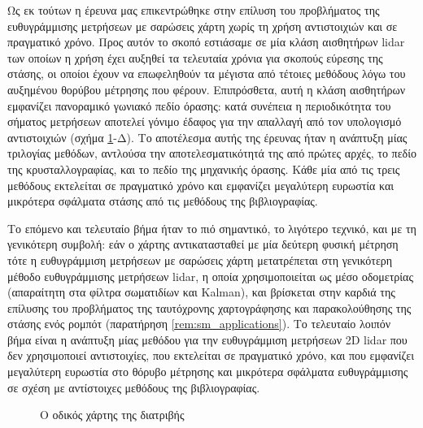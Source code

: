 Ως εκ τούτων η έρευνα μας επικεντρώθηκε στην επίλυση του προβλήματος της
ευθυγράμμισης μετρήσεων με σαρώσεις χάρτη χωρίς τη χρήση αντιστοιχιών και σε
πραγματικό χρόνο. Προς αυτόν το σκοπό εστιάσαμε σε μία κλάση αισθητήρων lidar
των οποίων η χρήση έχει αυξηθεί τα τελευταία χρόνια για σκοπούς εύρεσης της
στάσης, οι οποίοι έχουν να επωφεληθούν τα μέγιστα από τέτοιες μεθόδους λόγω
του αυξημένου θορύβου μέτρησης που φέρουν. Επιπρόσθετα, αυτή η κλάση αισθητήρων
εμφανίζει πανοραμικό γωνιακό πεδίο όρασης: κατά συνέπεια η περιοδικότητα του
σήματος μετρήσεων αποτελεί γόνιμο έδαφος για την απαλλαγή από τον υπολογισμό
αντιστοιχιών (σχήμα \ref{fig:roadmap}-Δ). Το αποτέλεσμα αυτής της έρευνας ήταν
η ανάπτυξη μίας τριλογίας μεθόδων, αντλούσα την αποτελεσματικότητά της από
πρώτες αρχές, το πεδίο της κρυσταλλογραφίας, και το πεδίο της μηχανικής όρασης.
Κάθε μία από τις τρεις μεθόδους εκτελείται σε πραγματικό χρόνο και εμφανίζει
μεγαλύτερη ευρωστία και μικρότερα σφάλματα στάσης από τις μεθόδους της
βιβλιογραφίας.

Το επόμενο και τελευταίο βήμα ήταν το πιό σημαντικό, το λιγότερο τεχνικό, και
με τη γενικότερη συμβολή: εάν ο χάρτης αντικατασταθεί με μία δεύτερη φυσική
μέτρηση τότε η ευθυγράμμιση μετρήσεων με σαρώσεις χάρτη μετατρέπεται στη
γενικότερη μέθοδο ευθυγράμμισης μετρήσεων lidar, η οποία χρησιμοποιείται
ως μέσο οδομετρίας (απαραίτητη στα φίλτρα σωματιδίων και Kalman), και βρίσκεται
στην καρδιά της επίλυσης του προβλήματος της ταυτόχρονης χαρτογράφησης και
παρακολούθησης της στάσης ενός ρομπότ (παρατήρηση \ref{rem:sm_applications}).
Το τελευταίο λοιπόν βήμα είναι η ανάπτυξη μίας μεθόδου για την ευθυγράμμιση
μετρήσεων 2D lidar που δεν χρησιμοποιεί αντιστοιχίες, που εκτελείται σε
πραγματικό χρόνο, και που εμφανίζει μεγαλύτερη ευρωστία στο θόρυβο μέτρησης
και μικρότερα σφάλματα ευθυγράμμισης σε σχέση με αντίστοιχες μεθόδους της
βιβλιογραφίας.


\begin{figure}\hspace{-2cm}
  
  \caption{Ο οδικός χάρτης της διατριβής}
  \label{fig:roadmap}
\end{figure}
